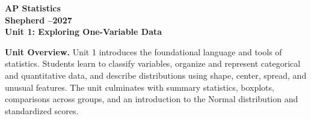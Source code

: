 \documentclass[10pt]{article}
\begin{document}
\vspace{-1.3in}

\begin{center}
  {\color{white}\bfseries\fontsize{28}{34}\selectfont AP Statistics}\\[8pt]
  {\color{goldacc}\bfseries\Large Shepherd --2027}\\[14pt]
  {\color{white}\bfseries\LARGE Unit 1: Exploring One-Variable Data}\\[4pt]
\end{center}

\vspace{0.30in}

\begin{tcolorbox}[colback=sky,colframe=navy,boxrule=0.9pt,arc=2mm,
    left=4mm,right=4mm,top=3mm,bottom=3mm]
  \textbf{Unit Overview.}\quad
  Unit 1 introduces the foundational language and tools of statistics. Students learn
  to classify variables, organize and represent categorical and quantitative data,
  and describe distributions using shape, center, spread, and unusual features.
  The unit culminates with summary statistics, boxplots, comparisons across groups,
  and an introduction to the Normal distribution and standardized scores.
\end{tcolorbox}

\vspace{0.22in}
\end{document}
